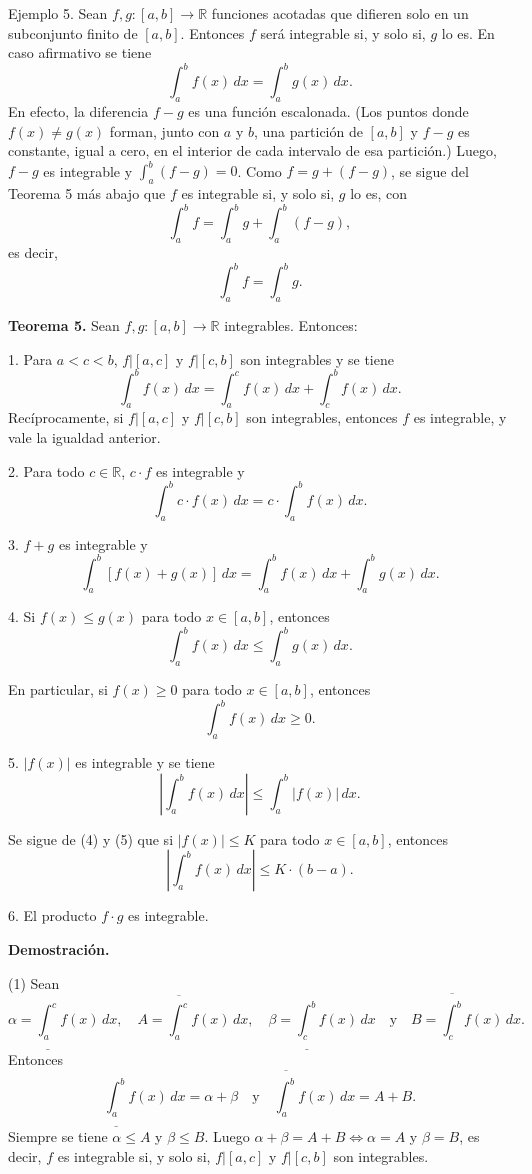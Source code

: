 \documentclass[12pt,oneside]{book}
\begin{document}
Ejemplo 5. Sean \(f, g: [a, b] \to \mathbb{R}\) funciones acotadas que difieren solo en un subconjunto finito de \([a, b]\). Entonces \(f\) será integrable si, y solo si, \(g\) lo es. En caso afirmativo se tiene
\[
\int_a^b f(x) \, dx = \int_a^b g(x) \, dx.
\]
En efecto, la diferencia \(f - g\) es una función escalonada. (Los puntos donde \(f(x) \neq g(x)\) forman, junto con \(a\) y \(b\), una partición de \([a, b]\) y \(f - g\) es constante, igual a cero, en el interior de cada intervalo de esa partición.) Luego, \(f - g\) es integrable y \(\int_a^b (f - g) = 0\). Como \(f = g + (f - g)\), se sigue del Teorema 5 más abajo que \(f\) es integrable si, y solo si, \(g\) lo es, con
\[
\int_a^b f = \int_a^b g + \int_a^b (f - g),
\]
es decir,
\[
\int_a^b f = \int_a^b g.
\]

\textbf{Teorema 5.} Sean \(f, g: [a, b] \to \mathbb{R}\) integrables. Entonces:

1. Para \(a < c < b\), \(f|[a, c]\) y \(f|[c, b]\) son integrables y se tiene
\[
\int_a^b f(x) \, dx = \int_a^c f(x) \, dx + \int_c^b f(x) \, dx.
\]
Recíprocamente, si \(f|[a, c]\) y \(f|[c, b]\) son integrables, entonces \(f\) es integrable, y vale la igualdad anterior.

2. Para todo \(c \in \mathbb{R}\), \(c \cdot f\) es integrable y
\[
\int_a^b c \cdot f(x) \, dx = c \cdot \int_a^b f(x) \, dx.
\]

3. \(f + g\) es integrable y
\[
\int_a^b [f(x) + g(x)] \, dx = \int_a^b f(x) \, dx + \int_a^b g(x) \, dx.
\]

4. Si \(f(x) \leq g(x)\) para todo \(x \in [a, b]\), entonces
\[
\int_a^b f(x) \, dx \leq \int_a^b g(x) \, dx.
\]

En particular, si \(f(x) \geq 0\) para todo \(x \in [a, b]\), entonces
\[
\int_a^b f(x) \, dx \geq 0.
\]

5. \(|f(x)|\) es integrable y se tiene
\[
\left| \int_a^b f(x) \, dx \right| \leq \int_a^b |f(x)| \, dx.
\]

Se sigue de (4) y (5) que si \(|f(x)| \leq K\) para todo \(x \in [a, b]\), entonces
\[
\left| \int_a^b f(x) \, dx \right| \leq K \cdot (b - a).
\]

6. El producto \(f \cdot g\) es integrable.

\textbf{Demostración.}

(1) Sean
\[
\alpha = \underline{\int_a^c} f(x) \, dx, \quad A = \overline{\int_a^c} f(x) \, dx, \quad
\beta = \underline{\int_c^b} f(x) \, dx \quad \text{y} \quad
B = \overline{\int_c^b} f(x) \, dx.
\]
Entonces
\[
\underline{\int_a^b} f(x) \, dx = \alpha + \beta
\quad \text{y} \quad
\overline{\int_a^b} f(x) \, dx = A + B.
\]
Siempre se tiene \(\alpha \leq A\) y \(\beta \leq B\). Luego \(\alpha + \beta = A + B \iff \alpha = A\) y \(\beta = B\), es decir, \(f\) es integrable si, y solo si, \(f|[a, c]\) y \(f|[c, b]\) son integrables.
\end{document}
